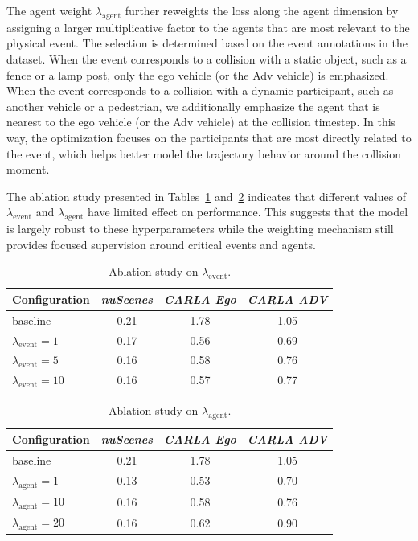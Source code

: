 \documentclass[runningheads]{llncs}
\begin{document}
The agent weight $\lambda_{\text{agent}}$ further reweights the loss along the agent dimension by assigning a larger multiplicative factor to the agents that are most relevant to the physical event. The selection is determined based on the event annotations in the dataset. When the event corresponds to a collision with a static object, such as a fence or a lamp post, only the ego vehicle (or the Adv vehicle) is emphasized. When the event corresponds to a collision with a dynamic participant, such as another vehicle or a pedestrian, we additionally emphasize the agent that is nearest to the ego vehicle (or the Adv vehicle) at the collision timestep. In this way, the optimization focuses on the participants that are most directly related to the event, which helps better model the trajectory behavior around the collision moment.

The ablation study presented in Tables~\ref{tab:performance_event} and~\ref{tab:performance_agent} indicates that different values of $\lambda_{\text{event}}$ and $\lambda_{\text{agent}}$ have limited effect on performance. This suggests that the model is largely robust to these hyperparameters while the weighting mechanism still provides focused supervision around critical events and agents.

\begin{table}[ht]
\centering
\caption{Ablation study on $\lambda_{\text{event}}$.}
\vspace{5pt}
\label{tab:performance_event}
\begin{tabular}{lccc}
\toprule
\textbf{Configuration} & \textit{nuScenes} & \textit{CARLA Ego} & \textit{CARLA ADV} \\
\midrule
baseline & 0.21 & 1.78 & 1.05 \\
$\lambda_{\text{event}}=1$  & 0.17 & 0.56 & 0.69 \\
$\lambda_{\text{event}}=5$  & 0.16 & 0.58 & 0.76 \\
$\lambda_{\text{event}}=10$ & 0.16 & 0.57 & 0.77 \\
\bottomrule
\end{tabular}
\end{table}

\begin{table}[h]
\centering
\caption{Ablation study on $\lambda_{\text{agent}}$.}
\vspace{5pt}
\label{tab:performance_agent}
\begin{tabular}{lccc}
\toprule
\textbf{Configuration} & \textit{nuScenes} & \textit{CARLA Ego} & \textit{CARLA ADV} \\
\midrule
baseline & 0.21 & 1.78 & 1.05 \\
$\lambda_{\text{agent}}=1$   & 0.13 & 0.53 & 0.70 \\
$\lambda_{\text{agent}}=10$  & 0.16 & 0.58 & 0.76 \\
$\lambda_{\text{agent}}=20$  & 0.16 & 0.62 & 0.90 \\
\bottomrule
\end{tabular}
\end{table}
\end{document}
